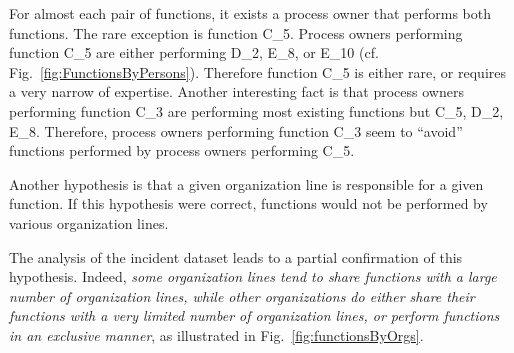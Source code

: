 \documentclass[lnbip]{svmultln}
\begin{document}
For almost each pair of functions, it exists a process owner that performs both functions. The rare exception is function C\_5. Process owners performing function C\_5 are either performing D\_2, E\_8, or E\_10 (cf. Fig.~\ref{fig:FunctionsByPersons}). Therefore function C\_5 is either rare, or requires a very narrow of expertise. Another interesting fact is that process owners performing function C\_3 are performing most existing functions but C\_5, D\_2, E\_8. Therefore, process owners performing function C\_3 seem to ``avoid'' functions performed by process owners performing C\_5.

Another hypothesis is that a given organization line is responsible for a given function. If this hypothesis were correct, functions would not be performed by various organization lines.

The analysis of the incident dataset leads to a partial confirmation of this hypothesis. Indeed, \emph{some organization lines tend to share functions with a large number of organization lines, while other organizations do either share their functions with a very limited number of organization lines, or perform functions in an exclusive manner}, as illustrated in Fig.~\ref{fig:functionsByOrgs}. 
\end{document}
